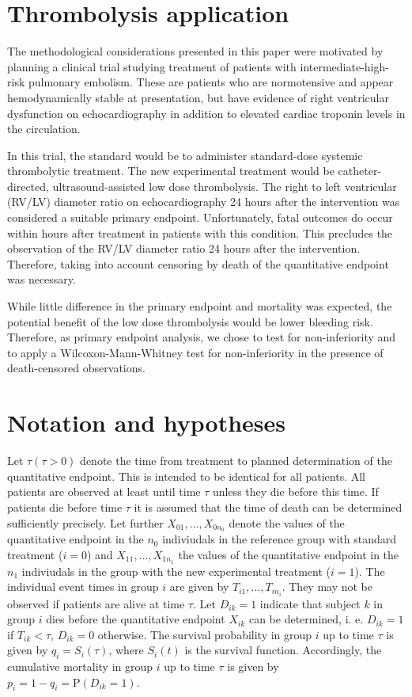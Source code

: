\documentclass[bimj,fleqn]{w-art}\usepackage[]{graphicx}\usepackage[]{color}
\theoremstyle{plain}
\theoremstyle{definition}
\begin{document}
\section{Thrombolysis application}
\label{sec:ThrombolysisApplication}
The methodological considerations presented in this paper were motivated by
planning a clinical trial studying treatment of patients with
intermediate-high-risk pulmonary embolism. These are patients who are
normotensive and appear hemodynamically stable at presentation, but have
evidence of right ventricular dysfunction on echocardiography in addition to
elevated cardiac troponin levels in the circulation.

In this trial, the standard would be to administer standard-dose systemic
thrombolytic treatment. The new experimental treatment would be catheter-directed,
ultrasound-assisted low dose thrombolysis. The right to left ventricular (RV/LV)
diameter ratio on echocardiography 24 hours after the intervention was
considered a suitable primary endpoint. Unfortunately, fatal
outcomes do occur within hours after treatment in patients with this condition.
This precludes the observation of the RV/LV diameter ratio 24 hours after the
intervention. Therefore, taking into account censoring by death of the
quantitative endpoint was necessary.

While little difference in the primary endpoint and mortality was expected,
the potential benefit of the low dose thrombolysis would be lower bleeding
risk. Therefore, as primary endpoint analysis, we chose to test for
non-inferiority and to apply a Wilcoxon-Mann-Whitney test for non-inferiority
in the presence of death-censored observations.

\section{Notation and hypotheses}
\label{sec:Notation}
Let  $\tau (\tau > 0)$ denote the time from treatment to planned determination of the
quantitative endpoint. This is intended to be identical for all patients. All patients
are observed at least until time $\tau$ unless they die before this time. If patients
die before time $\tau$ it is assumed that the time of death can be determined
sufficiently precisely. Let further $X_{01}, \ldots, X_{0n_0}$ denote the values
of the quantitative endpoint in the $n_0$ indiviudals in the reference group
with standard treatment ($i=0$) and $X_{11}, \ldots, X_{1n_1}$ the values of the
quantitative endpoint in the $n_1$ indiviudals in the group with the new
experimental treatment ($i=1$). The individual event times in group $i$ are
given by $T_{i1}, \ldots, T_{in_i}$. They may not be observed if patients are
alive at time $\tau$. Let $D_{ik} = 1$ indicate that subject $k$ in group $i$
dies before the quantitative endpoint $X_{ik}$ can be determined, i. e.
$D_{ik} = 1$ if $T_{ik} < \tau $, $D_{ik} = 0$ otherwise. The survival
probability in group $i$ up to time $\tau$ is given by $q_i = S_i(\tau)$, where
$S_{i}(t)$ is the survival function. Accordingly, the cumulative mortality in group
$i$ up to time $\tau$ is given by $p_i = 1 - q_i = \text{P}(D_{ik} = 1)$.
\end{document}
